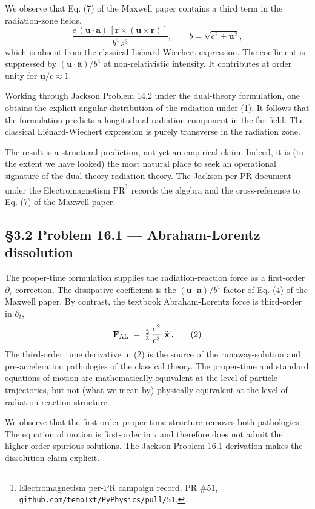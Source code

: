 \documentclass[
  11pt,
]{article}
\begin{document}
We observe that Eq. (7) of the Maxwell paper contains a third term in
the radiation-zone fields, \[
\frac{e\,(\mathbf{u}\cdot\mathbf{a})\,[\mathbf{r}\times(\mathbf{u}\times\mathbf{r})]}{b^{4}\,s^{3}},
\qquad b = \sqrt{c^{2} + \mathbf{u}^{2}},
\tag{1}
\] which is absent from the classical Liénard-Wiechert expression. The
coefficient is suppressed by \((\mathbf{u}\cdot\mathbf{a})/b^{4}\) at
non-relativistic intensity. It contributes at order unity for
\(\mathbf{u}/c \approx 1\).

Working through Jackson Problem 14.2 under the dual-theory formulation,
one obtains the explicit angular distribution of the radiation under
(1). It follows that the formulation predicts a longitudinal radiation
component in the far field. The classical Liénard-Wiechert expression is
purely transverse in the radiation zone.

The result is a structural prediction, not yet an empirical claim.
Indeed, it is (to the extent we have looked) the most natural place to
seek an operational signature of the dual-theory radiation theory. The
Jackson per-PR document under the Electromagnetism PR\footnote{Electromagnetism
  per-PR campaign record. PR \#51,
  \texttt{github.com/temoTxt/PyPhysics/pull/51}.} records the algebra
and the cross-reference to Eq. (7) of the Maxwell paper.

\hypertarget{problem-16.1-abraham-lorentz-dissolution}{%
\subsection{§3.2 Problem 16.1 --- Abraham-Lorentz
dissolution}\label{problem-16.1-abraham-lorentz-dissolution}}

The proper-time formulation supplies the radiation-reaction force as a
first-order \(\partial_{\tau}\) correction. The dissipative coefficient
is the \((\mathbf{u}\cdot\mathbf{a})/b^{4}\) factor of Eq. (4) of the
Maxwell paper. By contrast, the textbook Abraham-Lorentz force is
third-order in \(\partial_{t}\), \[
\mathbf{F}_{\rm AL} \;=\; \tfrac{2}{3}\,\frac{e^{2}}{c^{3}}\,\dddot{\mathbf{x}}.
\tag{2}
\] The third-order time derivative in (2) is the source of the
runaway-solution and pre-acceleration pathologies of the classical
theory. The proper-time and standard equations of motion are
mathematically equivalent at the level of particle trajectories, but not
(what we mean by) physically equivalent at the level of
radiation-reaction structure.

We observe that the first-order proper-time structure removes both
pathologies. The equation of motion is first-order in \(\tau\) and
therefore does not admit the higher-order spurious solutions. The
Jackson Problem 16.1 derivation makes the dissolution claim explicit.
\end{document}
